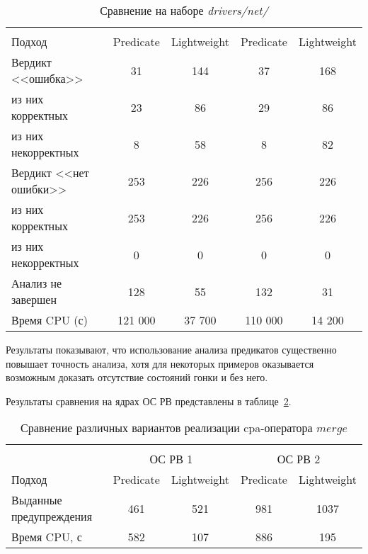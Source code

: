   \begin{table}[h]\footnotesize \centering
    \caption{Сравнение на наборе \textit{drivers/net/}}
  	\label{table-drivers-predicate}
    \begin{tabular}{ | l | c | c | c | c |}
      \hline
      & 			 \multicolumn{2}{c|}{\theoryraces} & 	\multicolumn{2}{c|}{\combatmode}\\
      Подход         				& Predicate & Lightweight 	& Predicate & Lightweight\\ \hline
      Вердикт <<ошибка>> 				& 31   		& 144   	& 37   		& 168  	\\ 
  \hspace{0.5cm} из них корректных 	& 23 		& 86 		& 29   		& 86 	\\ 
  \hspace{0.5cm} из них некорректных & 8 		& 58 		& 8   		& 82 	\\ \hline
      Вердикт <<нет ошибки>>  		& 253    	& 226    	& 256   	& 226 	\\ 
  \hspace{0.5cm} из них корректных 	& 253 		& 226    	& 256   	& 226 	\\
  \hspace{0.5cm} из них некорректных & 0 		& 0    		& 0   		& 0 	\\ \hline
      Анализ не завершен       		& 128    	& 55    	& 132   	& 31  	\\ \hline
      Время CPU (с)   				& 121 000 	& 37 700 	& 110 000  	& 14 200\\ 
      \hline
    \end{tabular}
  \end{table}

Результаты показывают, что использование анализа предикатов существенно повышает точность анализа, хотя для некоторых примеров оказывается возможным доказать отсутствие состояний гонки и без него.

Результаты сравнения на ядрах ОС РВ представлены в таблице~\ref{table-os-predicate}.

  \begin{table}[h] \footnotesize \centering
    \caption{Сравнение различных вариантов реализации cpa-оператора $merge$}
  	\label{table-os-predicate}
    \begin{tabular}{ | l | c | c | c | c |  }
      \hline
      		& 		\multicolumn{4}{c|}{\combatmode}  \\
      		& 			 \multicolumn{2}{c|}{ОС РВ 1} & 	\multicolumn{2}{c|}{ОС РВ 2}\\
      Подход         					& Predicate  & Lightweight 	& Predicate  & Lightweight 	\\ \hline
      Выданные предупреждения			& 461   	& 521    		& 981   	& 1037  			\\ 
  	  Время CPU, с 						& 582   	& 107  			& 886   	& 195  		\\ 
      \hline
    \end{tabular}
  \end{table}
  
